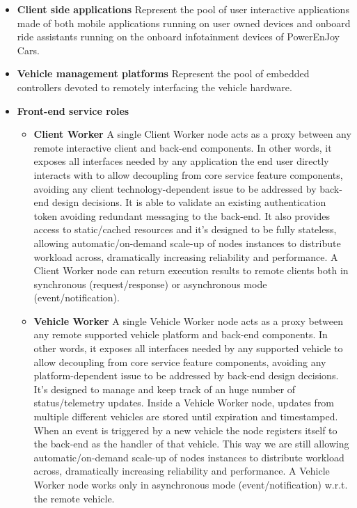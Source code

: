 \begin{itemize}
\item{\textbf{Client side applications}}\newline
Represent the pool of user interactive applications made of both mobile applications running on user owned devices and onboard ride assistants running on the onboard infotainment devices of PowerEnJoy Cars.
\item{\textbf{Vehicle management platforms}}\newline
Represent the pool of embedded controllers devoted to remotely interfacing the vehicle hardware.

\item{\textbf{Front-end service roles}}
\begin{itemize}
\item{\textbf{Client Worker}}\newline
A single Client Worker node acts as a proxy between any remote interactive client and back-end components. In other words, it exposes all interfaces needed by any application the end user directly interacts with to allow decoupling from core service feature components, avoiding any client technology-dependent issue to be addressed by back-end design decisions. It is able to validate an existing authentication token avoiding redundant messaging to the back-end. It also provides access to static/cached resources and it's designed to be fully stateless, allowing automatic/on-demand scale-up of nodes instances to distribute workload across, dramatically increasing reliability and performance. A Client Worker node can return execution results to remote clients both in synchronous (request/response) or asynchronous mode (event/notification).
\item{\textbf{Vehicle Worker}}\newline
A single Vehicle Worker node acts as a proxy between any remote supported vehicle platform and back-end components. In other words, it exposes all interfaces needed by any supported vehicle to allow decoupling from core service feature components, avoiding any platform-dependent issue to be addressed by back-end design decisions. It's designed to manage and keep track of an huge number of status/telemetry updates. Inside a Vehicle Worker node, updates from multiple different vehicles are stored until expiration and timestamped. When an event is triggered by a new vehicle the node registers itself to the back-end as the handler of that vehicle. This way we are still allowing automatic/on-demand scale-up of nodes instances to distribute workload across, dramatically increasing reliability and performance. A Vehicle Worker node works only in asynchronous mode (event/notification) w.r.t. the remote vehicle.

\end{itemize}
\end{itemize}
